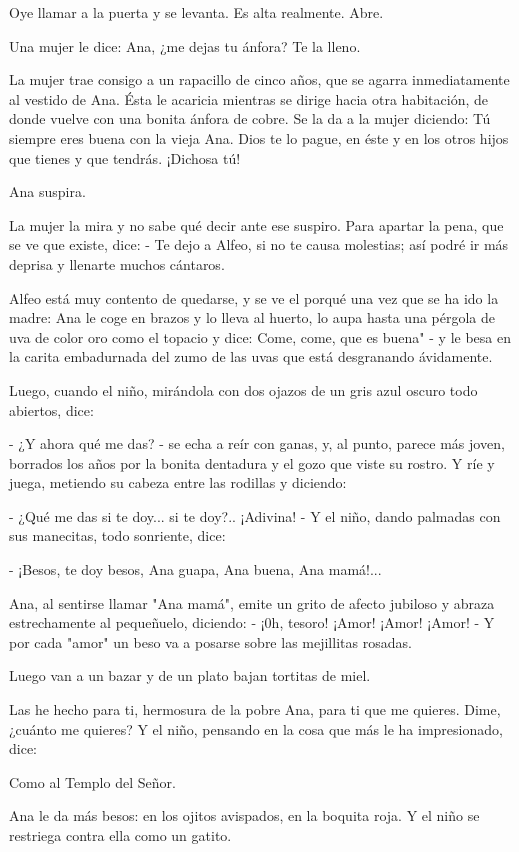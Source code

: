 \documentclass[12pt]{book} %
\begin{document}
Oye llamar a la puerta y se levanta. Es alta realmente. Abre. 

Una mujer le dice: Ana, ¿me dejas tu ánfora? Te la lleno. 

La mujer trae consigo a un rapacillo de cinco años, que se agarra inmediatamente al vestido de Ana. Ésta le acaricia mientras se dirige hacia otra habitación, de donde vuelve con una bonita ánfora de cobre. Se la da a la mujer diciendo: Tú siempre eres buena con la vieja Ana. Dios te lo pague, en éste y en los otros hijos que tienes y que tendrás. ¡Dichosa tú!

Ana suspira. 

La mujer la mira y no sabe qué decir ante ese suspiro. Para apartar la pena, que se ve que existe, dice: - Te dejo a Alfeo, si no te causa molestias; así podré ir más deprisa y llenarte muchos cántaros. 

Alfeo está muy contento de quedarse, y se ve el porqué una vez que se ha ido la madre: Ana le coge en brazos y lo lleva al huerto, lo aupa hasta una pérgola de uva de color oro como el topacio y dice: Come, come, que es buena" - y le besa en la carita embadurnada del zumo de las uvas que está desgranando ávidamente. 

Luego, cuando el niño, mirándola con dos ojazos de un gris azul oscuro todo abiertos, dice: 

- ¿Y ahora qué me das? - se echa a reír con ganas, y, al punto, parece más joven, borrados los años por la bonita dentadura y el gozo que viste su rostro. Y ríe y juega, metiendo su cabeza entre las rodillas y diciendo: 

- ¿Qué me das si te doy... si te doy?.. ¡Adivina! - Y el niño, dando palmadas con sus manecitas, todo sonriente, dice: 

- ¡Besos, te doy besos, Ana guapa, Ana buena, Ana mamá!... 

Ana, al sentirse llamar "Ana mamá", emite un grito de afecto jubiloso y abraza estrechamente al pequeñuelo, diciendo: - ¡0h, tesoro! ¡Amor! ¡Amor! ¡Amor! - Y por cada "amor" un beso va a posarse sobre las mejillitas rosadas. 

Luego van a un bazar y de un plato bajan tortitas de miel. 

Las he hecho para ti, hermosura de la pobre Ana, para ti que me quieres. Dime, ¿cuánto me quieres? Y el niño, pensando en la cosa que más le ha impresionado, dice: 

Como al Templo del Señor. 

Ana le da más besos: en los ojitos avispados, en la boquita roja. Y el niño se restriega contra ella como un gatito. 
\end{document}
